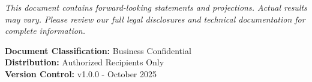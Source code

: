 \documentclass[12pt,a4paper]{article}
\begin{document}
\vfill

\begin{center}
\footnotesize
\textit{This document contains forward-looking statements and projections. Actual results may vary. Please review our full legal disclosures and technical documentation for complete information.}

\vspace{0.5cm}
\textbf{Document Classification:} Business Confidential\\
\textbf{Distribution:} Authorized Recipients Only\\
\textbf{Version Control:} v1.0.0 - October 2025
\end{center}
\end{document}
